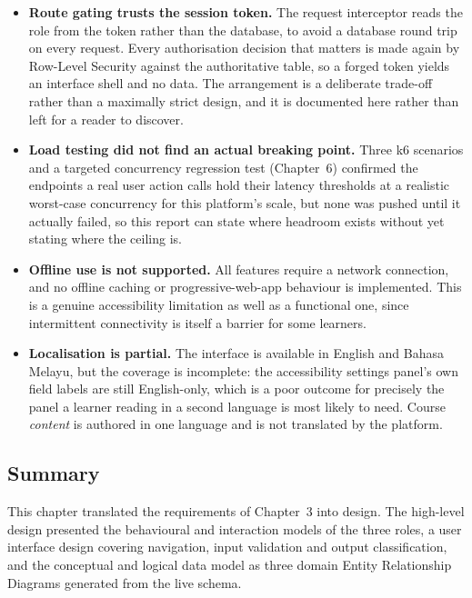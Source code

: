 \documentclass[12pt, oneside]{article} %
\begin{document}
\begin{itemize}
    \item \textbf{Route gating trusts the session token.} The request interceptor reads the role from the token rather than the database, to avoid a database round trip on every request. Every authorisation decision that matters is made again by Row-Level Security against the authoritative table, so a forged token yields an interface shell and no data. The arrangement is a deliberate trade-off rather than a maximally strict design, and it is documented here rather than left for a reader to discover.

    \item \textbf{Load testing did not find an actual breaking point.} Three k6 scenarios and a targeted concurrency regression test (Chapter~6) confirmed the endpoints a real user action calls hold their latency thresholds at a realistic worst-case concurrency for this platform's scale, but none was pushed until it actually failed, so this report can state where headroom exists without yet stating where the ceiling is.

    \item \textbf{Offline use is not supported.} All features require a network connection, and no offline caching or progressive-web-app behaviour is implemented. This is a genuine accessibility limitation as well as a functional one, since intermittent connectivity is itself a barrier for some learners.

    \item \textbf{Localisation is partial.} The interface is available in English and Bahasa Melayu, but the coverage is incomplete: the accessibility settings panel's own field labels are still English-only, which is a poor outcome for precisely the panel a learner reading in a second language is most likely to need. Course \emph{content} is authored in one language and is not translated by the platform.
\end{itemize}

\subsection{Summary}

This chapter translated the requirements of Chapter~3 into design. The high-level design presented the behavioural and interaction models of the three roles, a user interface design covering navigation, input validation and output classification, and the conceptual and logical data model as three domain Entity Relationship Diagrams generated from the live schema.
\end{document}
